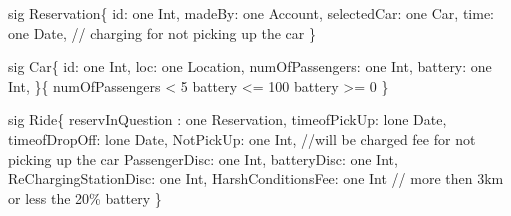 \documentclass[a4paper]{article}
\begin{document}
sig Reservation\{ \newline
\hspace*{5 mm}	id: one Int, \newline
\hspace*{5 mm}	madeBy: one Account, \newline
\hspace*{5 mm}	selectedCar: one Car, \newline
\hspace*{5 mm}	time: one Date, // charging for not picking up the car \newline
\} \newline

sig Car\{ \newline
\hspace*{5 mm}	id: one Int, \newline
\hspace*{5 mm}	loc: one Location, \newline
\hspace*{5 mm}	numOfPassengers: one Int, \newline
\hspace*{5 mm}	battery: one Int, \newline
\}\{ \newline
\hspace*{5 mm}	numOfPassengers < 5 \newline
\hspace*{5 mm}	battery <= 100 \newline
\hspace*{5 mm}	battery >= 0 \newline
\} \newline

sig Ride\{ \newline
\hspace*{5 mm}	reservInQuestion : one Reservation, \newline
\hspace*{5 mm}	timeofPickUp: lone Date, \newline
\hspace*{5 mm}	timeofDropOff: lone Date,  \newline
\hspace*{5 mm}	NotPickUp: one Int, //will be charged fee for not picking up the car \newline
\hspace*{5 mm}	PassengerDisc: one Int, \newline
\hspace*{5 mm}	batteryDisc: one Int, \newline
\hspace*{5 mm}	ReChargingStationDisc: one Int, \newline
\hspace*{5 mm}	HarshConditionsFee: one Int // more then 3km or less the 20\% battery  \newline 
\} \newline
\end{document}

